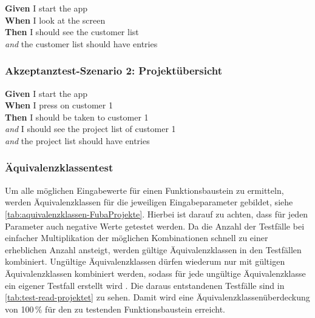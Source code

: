 \textbf{Given} I start the app\\
\textbf{When} I look at the screen\\
\textbf{Then} I should see the customer list\\
\textit{and} the customer list should have entries\\

\subsubsection{Akzeptanztest-Szenario 2: Projektübersicht}

\textbf{Given} I start the app\\
\textbf{When} I press on customer 1\\
\textbf{Then} I should be taken to customer 1\\
\textit{and} I should see the project list of customer 1\\
\textit{and} the project list should have entries\\



\subsubsection{Äquivalenzklassentest}
Um alle möglichen Eingabewerte für einen Funktionsbaustein zu ermitteln, werden Äquivalenzklassen für die jeweiligen Eingabeparameter gebildet, siehe \autoref{tab:aquivalenzklassen-FubaProjekte}. Hierbei ist darauf zu achten, dass für jeden Parameter auch negative Werte getestet werden. Da die Anzahl der Testfälle bei einfacher Multiplikation der möglichen Kombinationen schnell zu einer erheblichen Anzahl ansteigt, werden gültige Äquivalenzklassen in den Testfällen kombiniert. Ungültige Äquivalenzklassen dürfen wiederum nur mit gültigen Äquivalenzklassen kombiniert werden, sodass für jede ungültige Äquivalenzklasse ein eigener Testfall erstellt wird \cite[S.\ 110-115]{Spillner2010}. Die daraus entstandenen Testfälle sind in \autoref{tab:test-read-projektet} zu sehen. Damit wird eine Äquivalenzklassenüberdeckung von 100\,\% für den zu testenden Funktionsbaustein erreicht.

